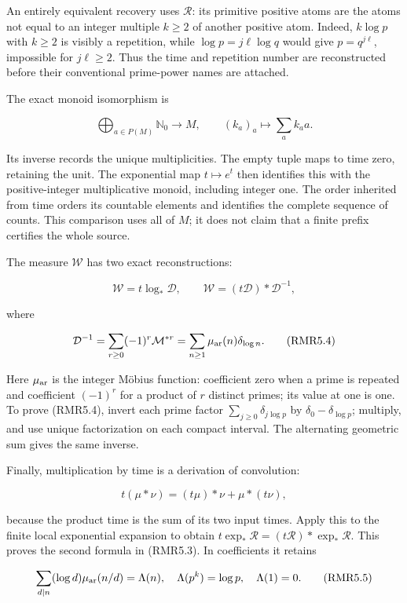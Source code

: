 An entirely equivalent recovery uses \(\mathcal R\): its primitive
positive atoms are the atoms not equal to an integer multiple \(k\ge2\)
of another positive atom. Indeed, \(k\log p\) with \(k\ge2\) is visibly
a repetition, while \(\log p=j\ell\log q\) would give \(p=q^{j\ell}\),
impossible for \(j\ell\ge2\). Thus the time and repetition number are
reconstructed before their conventional prime-power names are attached.

The exact monoid isomorphism is

\[
\bigoplus_{a\in P(M)}\mathbb N_0\longrightarrow M,
\qquad (k_a)_a\longmapsto\sum_a k_a a.
\tag{RMR5.2}
\]

Its inverse records the unique multiplicities. The empty tuple maps to
time zero, retaining the unit. The exponential map \(t\mapsto e^t\) then
identifies this with the positive-integer multiplicative monoid,
including integer one. The order inherited from time orders its
countable elements and identifies the complete sequence of counts. This
comparison uses all of \(M\); it does not claim that a finite prefix
certifies the whole source.

The measure \(\mathcal W\) has two exact reconstructions:

\[
\mathcal W=t\log_*\mathcal D,
\qquad
\mathcal W=(t\mathcal D)*\mathcal D^{-1},
\tag{RMR5.3}
\]

where

\[
\mathcal D^{-1}=\sum_{r\ge0}(-1)^r\mathcal M^{*r}
=\sum_{n\ge1}\mu_{\rm ar}(n)\delta_{\log n}.
\tag{RMR5.4}
\]

Here \(\mu_{\rm ar}\) is the integer Möbius function: coefficient zero
when a prime is repeated and coefficient \((-1)^r\) for a product of
\(r\) distinct primes; its value at one is one. To prove (RMR5.4),
invert each prime factor \(\sum_{j\ge0}\delta_{j\log p}\) by
\(\delta_0-\delta_{\log p}\); multiply, and use unique factorization on
each compact interval. The alternating geometric sum gives the same
inverse.

Finally, multiplication by time is a derivation of convolution:

\[
t(\mu*\nu)=(t\mu)*\nu+\mu*(t\nu),
\]

because the product time is the sum of its two input times. Apply this
to the finite local exponential expansion to obtain
\(t\exp_*\mathcal R=(t\mathcal R)*\exp_*\mathcal R\). This proves the
second formula in (RMR5.3). In coefficients it retains

\[
\sum_{d\mid n}(\log d)\mu_{\rm ar}(n/d)=\Lambda(n),
\quad
\Lambda(p^k)=\log p,\quad \Lambda(1)=0.
\tag{RMR5.5}
\]

